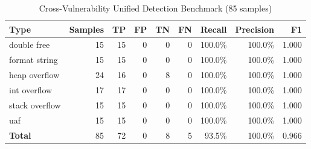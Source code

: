 \begin{table}[h]
\centering
\caption{Cross-Vulnerability Unified Detection Benchmark (85 samples)}
\label{tab:unified}
\begin{tabular}{lrrrrrrrr}
\toprule
Type & Samples & TP & FP & TN & FN & Recall & Precision & F1 \\
\midrule
double free & 15 & 15 & 0 & 0 & 0 & 100.0\% & 100.0\% & 1.000 \\
format string & 15 & 15 & 0 & 0 & 0 & 100.0\% & 100.0\% & 1.000 \\
heap overflow & 24 & 16 & 0 & 8 & 0 & 100.0\% & 100.0\% & 1.000 \\
int overflow & 17 & 17 & 0 & 0 & 0 & 100.0\% & 100.0\% & 1.000 \\
stack overflow & 15 & 15 & 0 & 0 & 0 & 100.0\% & 100.0\% & 1.000 \\
uaf & 15 & 15 & 0 & 0 & 0 & 100.0\% & 100.0\% & 1.000 \\
\midrule
\textbf{Total} & 85 & 72 & 0 & 8 & 5 & 93.5\% & 100.0\% & 0.966 \\
\bottomrule
\end{tabular}
\end{table}